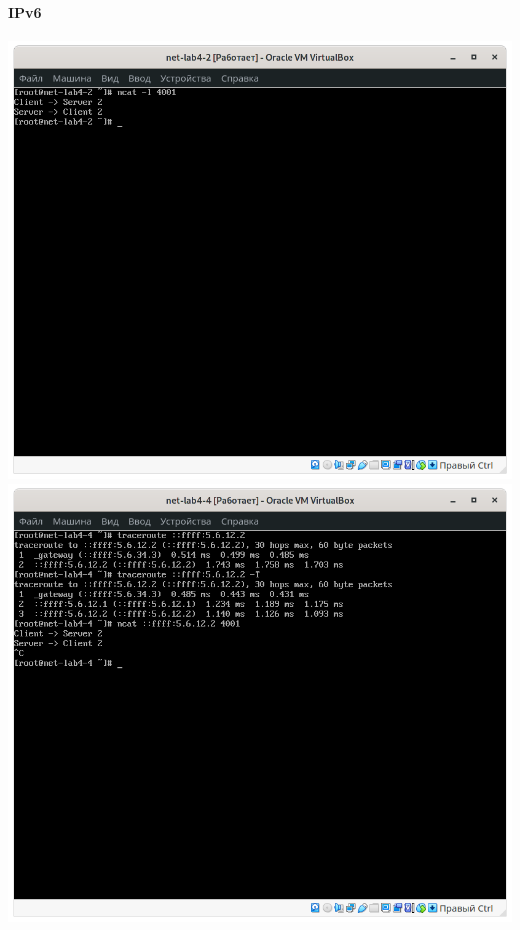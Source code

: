 \paragraph{IPv6}
\begin{center}
    \includegraphics[width=.49\textwidth]{screenshots/var2-ncat2-server-ipv6}
    \includegraphics[width=.49\textwidth]{screenshots/var2-ncat2-client-ipv6}
\end{center}

